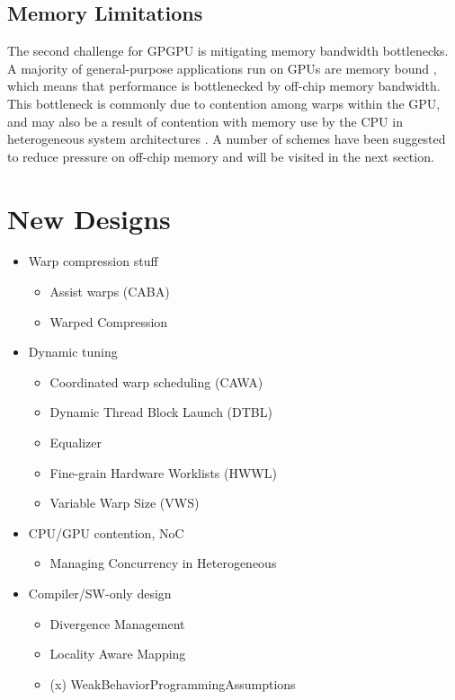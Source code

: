 \documentclass[prodmode,acmtecs]{acmsmall} %
\begin{document}
\subsection{Memory Limitations}
The second challenge for GPGPU is mitigating memory bandwidth bottlenecks. A
majority of general-purpose applications run on GPUs are memory bound
\cite{AssistWarps}, which means that performance is bottlenecked by off-chip
memory bandwidth. This bottleneck is commonly due to contention among warps
within the GPU, and may also be a result of contention with memory use by the
CPU in heterogeneous system architectures
\cite{ManagingConcurrencyInHeterogeneous}. A number of schemes have been
suggested to reduce pressure on off-chip memory and will be visited in the next
section.

\section{New Designs} \label{sec:research}
\begin{itemize}
\item Warp compression stuff
  \begin{itemize}
  \item Assist warps (CABA)
  \item Warped Compression
  \end{itemize}
\item Dynamic tuning
  \begin{itemize}
  \item Coordinated warp scheduling (CAWA)
  \item Dynamic Thread Block Launch (DTBL)
  \item Equalizer
  \item Fine-grain Hardware Worklists (HWWL)
  \item Variable Warp Size (VWS)
  \end{itemize}
\item CPU/GPU contention, NoC
  \begin{itemize}
  \item Managing Concurrency in Heterogeneous
  \end{itemize}
\item Compiler/SW-only design
  \begin{itemize}
  \item Divergence Management
  \item Locality Aware Mapping
  \item (x) WeakBehaviorProgrammingAssumptions
  \end{itemize}
\end{itemize}
\end{document}

